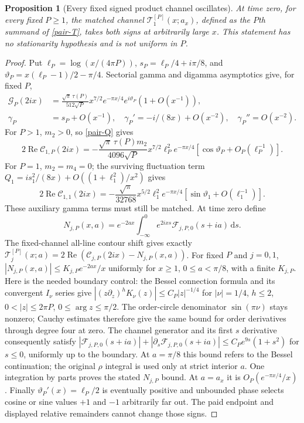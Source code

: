\documentclass[11pt]{article}
\newtheorem{proposition}[theorem]{Proposition}
\theoremstyle{definition}
\theoremstyle{remark}
\newcommand{\dd}{\,\mathrm d}
\newcommand{\Rea}{\operatorname{Re}}
\begin{document}
\begin{proposition}[Every fixed signed product channel oscillates]
\label{pair-oscillation}
At time zero, for every fixed $P\ge1$, the matched channel
$\mathcal T_1^{[P]}(x;a_x)$, defined as the $P$th summand of
\eqref{pair-T}, takes both signs at arbitrarily large $x$.
This statement has no stationarity hypothesis and is not uniform in $P$.
\end{proposition}
\begin{proof}
Put $\ell_P=\log(x/(4\pi P))$,
$s_P=\ell_P/4+i\pi/8$, and
$\vartheta_P=x(\ell_P-1)/2-\pi/4$.
Sectorial gamma and digamma asymptotics \cite{dlmfgamma} give, for fixed $P$,
\begin{align*}
 \mathcal G_P(2ix)&=
 \frac{\sqrt\pi\,\tau(P)}{512\sqrt P}x^{7/2}e^{-\pi x/4}
 e^{i\vartheta_P}(1+O(x^{-1})),\\
 \gamma_P&=s_P+O(x^{-1}),\quad
 \gamma_P'=-i/(8x)+O(x^{-2}),\quad \gamma_P''=O(x^{-2}).
\end{align*}
For $P>1$, $m_2>0$, so \eqref{pair-Q} gives
\[
 2\Rea\mathcal C_{1,P}(2ix)=
 -\frac{\sqrt\pi\,\tau(P)m_2}{4096\sqrt P}
 x^{7/2}\ell_P^2e^{-\pi x/4}
 [\cos\vartheta_P+O_P(\ell_P^{-1})].
\]
For $P=1$, $m_2=m_4=0$; the surviving fluctuation term
$Q_1=i s_1^2/(8x)+O((1+\ell_1^2)/x^2)$ gives
\[
 2\Rea\mathcal C_{1,1}(2ix)=
 -\frac{\sqrt\pi}{32768}x^{5/2}\ell_1^2e^{-\pi x/4}
 [\sin\vartheta_1+O(\ell_1^{-1})].
\]
These auxiliary gamma terms must still be matched. At time zero define
\[
 N_{j,P}(x,a)=e^{-2ax}\int_{-\infty}^0
 e^{2ixs}\mathcal F_{j,P,0}(s+ia)\dd s.
\]
The fixed-channel all-line contour shift gives exactly
$\mathcal T_j^{[P]}(x;a)=2\Rea(\mathcal C_{j,P}(2ix)-N_{j,P}(x,a))$.
For fixed $P$ and $j=0,1$,
$|N_{j,P}(x,a)|\le K_{j,P}e^{-2ax}/x$ uniformly for
$x\ge1$, $0\le a<\pi/8$, with a finite $K_{j,P}$.
Here is the needed boundary control: the Bessel connection formula
and its convergent $I_\nu$ series \cite[10.25.2, 10.27.4]{dlmfbessel}
give $|(z\partial_z)^hK_\nu(z)|\le C_P|z|^{-1/4}$
for $|\nu|=1/4$, $h\le2$,
$0<|z|\le2\pi P$, $0\le\arg z\le\pi/2$.
The order-circle denominator $\sin(\pi\nu)$ stays nonzero;
Cauchy estimates therefore give the same bound for order derivatives
through degree four at zero.
The channel generator and its first $s$ derivative consequently satisfy
$|\mathcal F_{j,P,0}(s+ia)|+
|\partial_s\mathcal F_{j,P,0}(s+ia)|
\le C_P e^{9s}(1+s^2)$ for $s\le0$, uniformly up to the boundary.
At $a=\pi/8$ this bound refers to the Bessel continuation; the original
$\rho$ integral is used only at strict interior $a$.
One integration by parts proves the stated $N_{j,P}$ bound.
At $a=a_x$ it is $O_P(e^{-\pi x/4}/x)$.
Finally $\vartheta_P'(x)=\ell_P/2$ is eventually positive and unbounded
phase selects cosine or sine values $+1$ and $-1$ arbitrarily far out.
The paid endpoint and displayed relative remainders cannot change those signs.
\end{proof}
\end{document}
